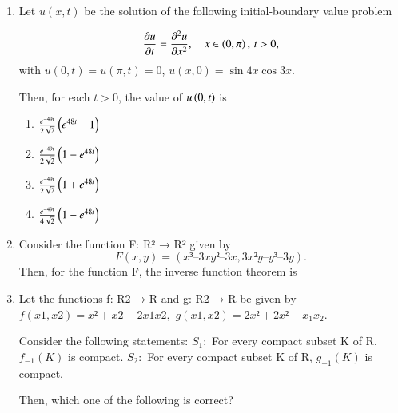 \documentclass[journal,12pt,onecolumn]{IEEEtran}
\theoremstyle{remark}
\begin{document}
\begin{enumerate}
\item Let $u(x,t)$ be the solution of the following initial-boundary value problem  

$$
\frac{\partial u}{\partial t} = \frac{\partial^2 u}{\partial x^2}, \quad x \in \left(0,\pi\right), \, t>0,
$$
with $u(0,t) = u(\pi,t) = 0$, $u(x,0) = \sin 4x \cos 3x$.  

Then, for each $t>0$, the value of $u \left(0,t\right)$ is  

\begin{enumerate}
\item $\frac{e^{-49t}}{2\sqrt{2}}\left(e^{48t}-1\right)$
\item $\frac{e^{-49t}}{2\sqrt{2}}\left(1-e^{48t}\right)$
\item $\frac{e^{-49t}}{2\sqrt{2}}\left(1+e^{48t}\right)$
\item $\frac{e^{-49t}}{4\sqrt{2}}\left(1-e^{48t}\right)$
\end{enumerate}  
\hfill{}

\item Consider the function F: R² → R² given by  
$$
F(x,y) = (x³ – 3xy² – 3x,3x²y – y³ – 3y).
$$  
Then, for the function F, the inverse function theorem is  

\begin{enumerate}
\end{enumerate}  
\hfill{}

\item Let the functions f: R2 → R and g: R2 → R be given by  
$f(x1, x2) = x² + x2 - 2x1x2,$  
$g(x1,x2) = 2x² + 2x² - x_1x_2.$  

Consider the following statements:  
$S_1:$ For every compact subset K of R, $f_{-1}(K)$ is compact.  
$S_2:$ For every compact subset K of R, $g_{-1}(K)$ is compact.  

Then, which one of the following is correct?  

\begin{enumerate}
\end{enumerate}  
\hfill{}


\end{enumerate}
\end{document}
